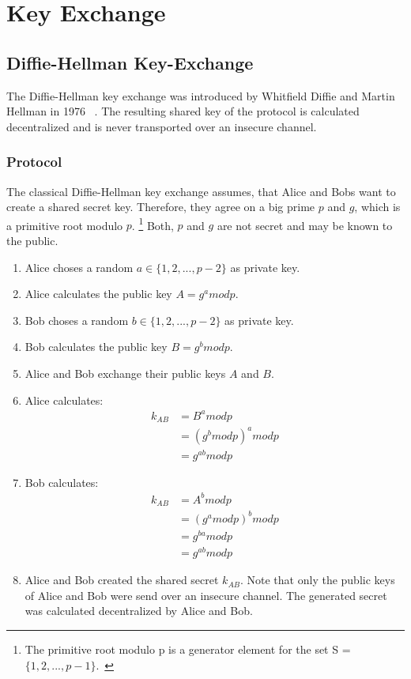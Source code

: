 \section{Key Exchange}
\subsection{Diffie-Hellman Key-Exchange}

The Diffie-Hellman key exchange was introduced by Whitfield Diffie and Martin Hellman in 1976 ~\parencite{diffie1976new}. The resulting shared key of the protocol is calculated decentralized and is never transported over an insecure channel.

\subsubsection{Protocol}
The classical Diffie-Hellman key exchange assumes, that Alice and Bobs want to create a shared secret key. Therefore, they agree on a big prime $p$ and $g$, which is a primitive root modulo $p$. \footnote{The primitive root modulo p is a generator element for the set S = $\{1, 2, ... , p-1\}$.~\parencite{ITSicherheit}} Both, $p$ and $g$ are not secret and may be known to the public. \parencite{watjen2018kryptographie}

\begin{enumerate}
\item Alice choses a random $a \in \{1, 2, ... , p-2\}$ as private key. 
\item Alice calculates the public key $A = g^a mod p$.
\item Bob choses a random $b \in \{1, 2, ... , p-2\}$ as private key. 
\item Bob calculates the public key $B = g^b mod p$.
\item Alice and Bob exchange their public keys $A$ and $B$.
\item Alice calculates: 
\begin{equation}
\begin{split}
k_{AB} & = B^a mod p \\
 & = (g^b mod p)^a mod p \\
 & = g^{a b} mod p
\end{split}
\end{equation}
\item Bob calculates: 
\begin{equation}
\begin{split}
k_{AB} & = A^b mod p \\
 & = (g^a mod p)^b mod p \\
 & = g^{b a} mod p \\
 & = g^{a b} mod p
\end{split}
\end{equation}
\item Alice and Bob created the shared secret $k_{AB}$. Note that only the public keys of Alice and Bob were send over an insecure channel. The generated secret was calculated decentralized by Alice and Bob.
\end{enumerate}

